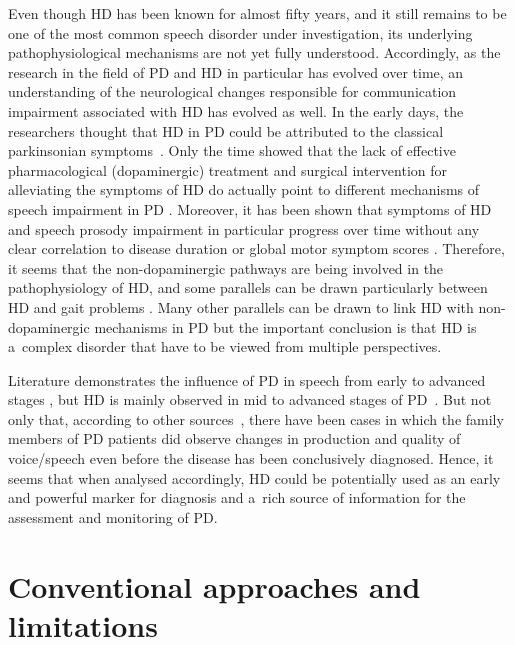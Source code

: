 Even though HD has been known for almost fifty years, and it still remains to be one of the most common speech disorder under investigation, its underlying pathophysiological mechanisms are not yet fully understood. Accordingly, as the research in the field of PD and HD in particular has evolved over time, an understanding of the neurological changes responsible for communication impairment associated with HD has evolved as well. In the early days, the researchers thought that HD in PD could be attributed to the classical parkinsonian symptoms~\cite{Darley1969}. Only the time showed that the lack of effective pharmacological (dopaminergic) treatment and surgical intervention for alleviating the symptoms of HD do actually point to different mechanisms of speech impairment in PD \cite{Skodda2011c, skodda2014, Elfmarkova2016}. Moreover, it has been shown that symptoms of HD and speech prosody impairment in particular progress over time without any clear correlation to disease duration or global motor symptom scores \cite{Skodda2009, Skodda2011b}. Therefore, it seems that the non-dopaminergic pathways are being involved in the pathophysiology of HD, and some parallels can be drawn particularly between HD and gait problems \cite{Moreau2007, Cantiniaux2010}. Many other parallels can be drawn to link HD with non-dopaminergic mechanisms in PD but the important conclusion is that HD is a~complex disorder that have to be viewed from multiple perspectives.

Literature demonstrates the influence of PD in speech from early to advanced stages \cite{Rusz2011, Skodda2013}, but HD is mainly observed in mid to advanced stages of PD~\cite{Duffy2013}. But not only that, according to other sources~\cite{Tetrud1991}, there have been cases in which the family members of PD patients did observe changes in production and quality of voice/speech even before the disease has been conclusively diagnosed. Hence, it seems that when analysed accordingly, HD could be potentially used as an early and powerful marker for diagnosis and a~rich source of information for the assessment and monitoring of PD. 

\section{Conventional approaches and limitations}
\label{ch2_2}

